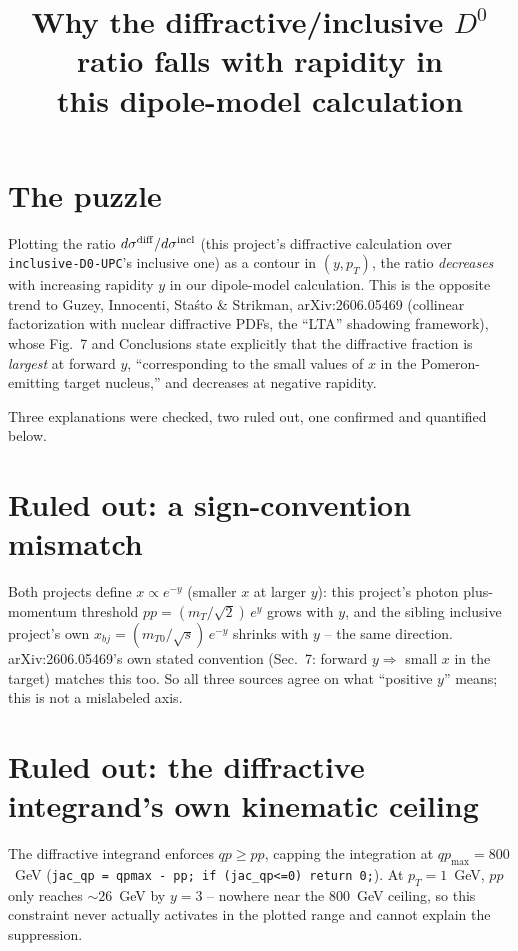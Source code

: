 \documentclass[11pt]{article}
\title{Why the diffractive/inclusive $D^0$ ratio falls with rapidity in\\
this dipole-model calculation}
\author{}
\date{}
\begin{document}
\maketitle

\section{The puzzle}

Plotting the ratio $d\sigma^{\rm diff}/d\sigma^{\rm incl}$ (this project's
diffractive calculation over \texttt{inclusive-D0-UPC}'s inclusive one) as a
contour in $(y,p_T)$, the ratio \emph{decreases} with increasing rapidity
$y$ in our dipole-model calculation. This is the opposite trend to
Guzey, Innocenti, Sta\'sto \& Strikman, arXiv:2606.05469 (collinear
factorization with nuclear diffractive PDFs, the ``LTA'' shadowing
framework), whose Fig.~7 and Conclusions state explicitly that the
diffractive fraction is \emph{largest} at forward $y$, ``corresponding to
the small values of $x$ in the Pomeron-emitting target nucleus,'' and
decreases at negative rapidity.

Three explanations were checked, two ruled out, one confirmed and
quantified below.

\section{Ruled out: a sign-convention mismatch}

Both projects define $x\propto e^{-y}$ (smaller $x$ at larger $y$): this
project's photon plus-momentum threshold $pp=(m_T/\sqrt2)\,e^{y}$ grows
with $y$, and the sibling inclusive project's own
$x_{bj}=(m_{T0}/\sqrt{s})\,e^{-y}$ shrinks with $y$ -- the same direction.
arXiv:2606.05469's own stated convention (Sec.~7: forward $y\Rightarrow$
small $x$ in the target) matches this too. So all three sources agree on
what ``positive $y$'' means; this is not a mislabeled axis.

\section{Ruled out: the diffractive integrand's own kinematic ceiling}

The diffractive integrand enforces $qp\ge pp$, capping the integration at
$qp_{\max}=800$~GeV (\texttt{jac\_qp = qpmax - pp; if (jac\_qp<=0) return
0;}). At $p_T=1$~GeV, $pp$ only reaches $\sim 26$~GeV by $y=3$ -- nowhere
near the 800~GeV ceiling, so this constraint never actually activates in
the plotted range and cannot explain the suppression.
\end{document}
